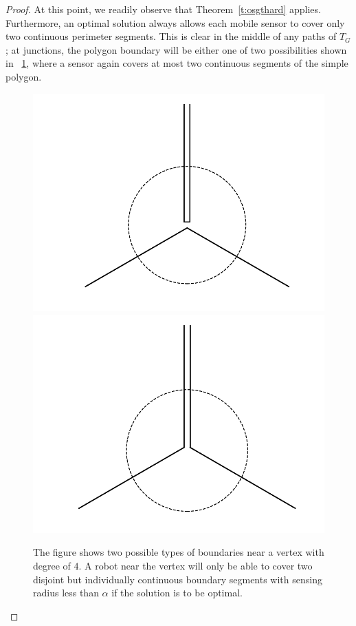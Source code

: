 \begin{proof}
At this point, we readily observe that Theorem~\ref{t:osgthard} applies. 
Furthermore, an optimal solution always allows each mobile sensor to 
cover only two continuous perimeter segments. This is clear in the middle 
of any paths of $T_G$; at junctions, the polygon boundary will be either 
one of two possibilities shown in ~\ref{fig:2types}, where a sensor
again covers at most two continuous segments of the simple polygon. 
\begin{figure}[!ht]
    \centering
    \includegraphics[scale=.29]{chapters/osg/figures/t1-eps-converted-to.pdf}
    \includegraphics[scale=.29]{chapters/osg/figures/t2-eps-converted-to.pdf}
    \caption{The figure shows two possible types of boundaries near a 
		vertex with degree of $4$. A robot near the vertex will only be able 
		to cover two disjoint but individually continuous boundary segments 
		with sensing radius less than $\alpha$ if the solution is to be optimal.}
    \label{fig:2types}
\end{figure}
\end{proof}
